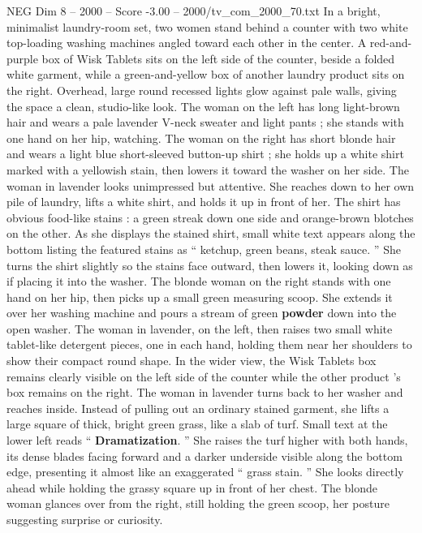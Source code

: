 \begin{textsample}{NEG Dim 8 – 2000 – Score -3.00 – 2000/tv\_com\_2000\_70.txt}  \label{ex:f8_neg_088}
In a bright, minimalist laundry-room set, two women stand behind a counter with two white top-loading washing machines angled toward each other in the center.
A red-and-purple box of Wisk Tablets sits on the left side of the counter, beside a folded white garment, while a green-and-yellow box of another laundry product sits on the right.
Overhead, large round recessed lights glow against pale walls, giving the space a clean, studio-like look.
The woman on the left has long light-brown hair and wears a pale lavender V-neck sweater and light pants ; she stands with one hand on her hip, watching.
The woman on the right has short blonde hair and wears a light blue short-sleeved button-up shirt ; she holds up a white shirt marked with a yellowish stain, then lowers it toward the washer on her side.
The woman in lavender looks unimpressed but attentive.
She reaches down to her own pile of laundry, lifts a white shirt, and holds it up in front of her.
The shirt has obvious food-like stains : a green streak down one side and orange-brown blotches on the other.
As she displays the stained shirt, small white text appears along the bottom listing the featured stains as “ ketchup, green beans, steak sauce. ” She turns the shirt slightly so the stains face outward, then lowers it, looking down as if placing it into the washer.
The blonde woman on the right stands with one hand on her hip, then picks up a small green measuring scoop.
She extends it over her washing machine and pours a stream of green \textbf{powder} down into the open washer.
The woman in lavender, on the left, then raises two small white tablet-like detergent pieces, one in each hand, holding them near her shoulders to show their compact round shape.
In the wider view, the Wisk Tablets box remains clearly visible on the left side of the counter while the other product ’s box remains on the right.
The woman in lavender turns back to her washer and reaches inside.
Instead of pulling out an ordinary stained garment, she lifts a large square of thick, bright green grass, like a slab of turf.
Small text at the lower left reads “ \textbf{Dramatization}. ” She raises the turf higher with both hands, its dense blades facing forward and a darker underside visible along the bottom edge, presenting it almost like an exaggerated “ grass stain. ” She looks directly ahead while holding the grassy square up in front of her chest.
The blonde woman glances over from the right, still holding the green scoop, her posture suggesting surprise or curiosity.

\end{textsample}
